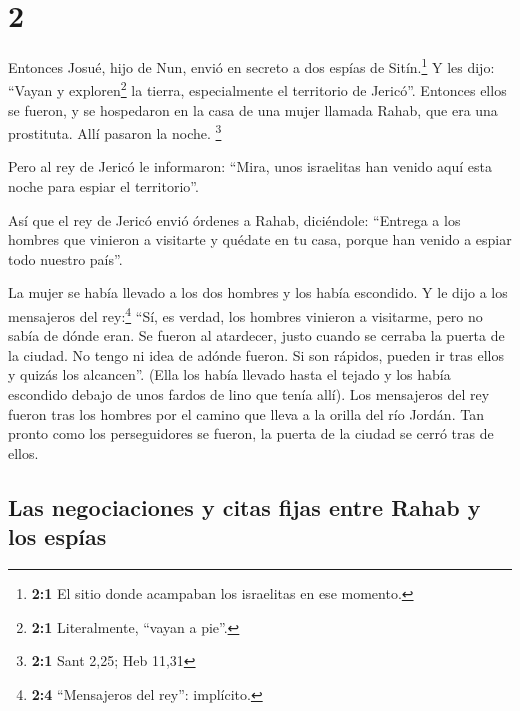 \hypertarget{section-1}{%
\section{2}\label{section-1}}

 Entonces Josué, hijo de Nun, envió en secreto a dos
espías de Sitín.\footnote{\textbf{2:1} El sitio donde acampaban los
  israelitas en ese momento.} Y les dijo: ``Vayan y exploren\footnote{\textbf{2:1}
  Literalmente, ``vayan a pie''.} la tierra, especialmente el territorio
de Jericó''. Entonces ellos se fueron, y se hospedaron en la casa de una
mujer llamada Rahab, que era una prostituta. Allí pasaron la noche.
\footnote{\textbf{2:1} Sant 2,25; Heb 11,31}

 Pero al rey de Jericó le informaron: ``Mira, unos
israelitas han venido aquí esta noche para espiar el territorio''.

 Así que el rey de Jericó envió órdenes a Rahab,
diciéndole: ``Entrega a los hombres que vinieron a visitarte y quédate
en tu casa, porque han venido a espiar todo nuestro país''.

 La mujer se había llevado a los dos hombres y los había
escondido. Y le dijo a los mensajeros del rey:\footnote{\textbf{2:4}
  ``Mensajeros del rey'': implícito.} ``Sí, es verdad, los hombres
vinieron a visitarme, pero no sabía de dónde eran.  Se
fueron al atardecer, justo cuando se cerraba la puerta de la ciudad. No
tengo ni idea de adónde fueron. Si son rápidos, pueden ir tras ellos y
quizás los alcancen''.  (Ella los había llevado hasta el
tejado y los había escondido debajo de unos fardos de lino que tenía
allí).  Los mensajeros del rey fueron tras los hombres por
el camino que lleva a la orilla del río Jordán. Tan pronto como los
perseguidores se fueron, la puerta de la ciudad se cerró tras de ellos.

\hypertarget{las-negociaciones-y-citas-fijas-entre-rahab-y-los-espuxedas}{%
\subsection{Las negociaciones y citas fijas entre Rahab y los
espías}\label{las-negociaciones-y-citas-fijas-entre-rahab-y-los-espuxedas}}

